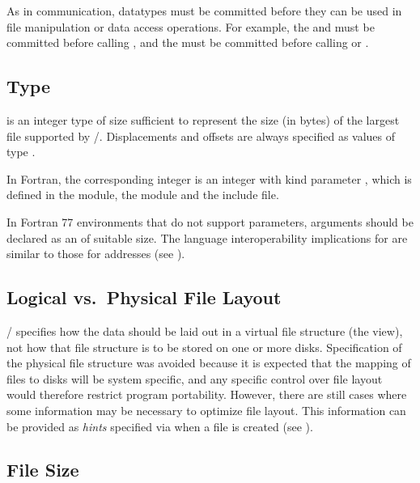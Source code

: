 As in communication, datatypes must be committed before they can
be used in file manipulation or data access operations.
For example, the  and 
must be
committed before calling ,
and the  must be committed before calling
 or .

\subsection{\texorpdfstring{}{MPI\_Offset} Type}
%
 is an integer type of size sufficient to represent
the size (in bytes) of the largest file supported by \MPI/.
Displacements and offsets are always specified as values of type .

In Fortran,
the corresponding integer is an integer
with kind parameter ,
which is 
defined in the  module, the  module and the 
 include file.

In Fortran 77 environments that do not support  parameters,
arguments should be declared
as an  of suitable size.
The language interoperability implications for 
are similar to those for addresses
(see ).

\subsection{Logical vs.\ Physical File Layout}
\mpi/ specifies how the data should be laid out
in a virtual file structure (the view),
not how that file structure is to be stored on one or more disks.
Specification of the physical file structure was
avoided because it is expected that the mapping of files
to disks will be system specific,
and any specific control over file layout would
therefore restrict program portability.
However, there are still cases where some information may be necessary
to optimize file layout.
This information can be provided as \emph{hints} specified via 
when a file is created (see ).

\subsection{File Size}
\label{sec:io-consistency-filesize}

